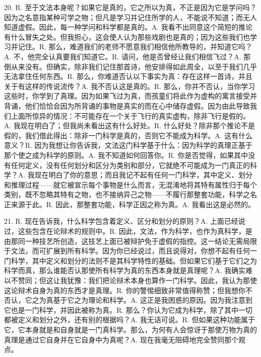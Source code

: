 20. R. 至于文法本身呢？如果它是真的，它之所以为真，不正是因为它是学问吗？因为之名意指某种可学之物；但凡是学习并记住所学的人，不能说不知道；而无人知道虚假。因此，每一种学问和科学都是真的。A. 我看不出同意这个简短的推论有什么冒失之处。但我担心，这会使人认为那些戏剧也是真的；因为这些我们也学习并记住。R. 那么，难道我们的老师不愿意我们相信他所教导的，并知道它吗？A. 不，他完全认真要我们知道它。R. 请问，他是否曾经让我们相信飞过？A. 那倒从来没有。但确实，除非我们记住那首诗，他安排得如此周全，以至于我们几乎无法拿住任何东西。R. 那么，你难道否认以下事实为真：存在这样一首诗，并且关于有这样的传说流传？A. 我不否认这是真的。R. 那么，你并不否认，当你学习这些时，你学到了真理。因为如果飞过为真，而孩童们将此作为虚构的寓言接受并背诵，他们恰恰会因为所背诵的事物是真实的而在心中储存虚假。因为由此导致我们上面所惊异的情况：不可能存在一个关于飞行的真实虚构，除非飞行是假的。A. 我现在明白了；但我尚未看出这有什么好处。R. 什么好处？除非那个推论不是假的，我们借此得出：除非一门科学是真的，否则它不能成为科学。A. 这有什么意义？R. 因为我想让你告诉我，文法这门科学基于什么：因为科学的真理正基于那个使之成为科学的原则。A. 我不知道如何回答你。R. 你是否觉得，如果其中没有任何定义，没有任何划分和区分为类别和部分，它就绝不可能成为一门真正的科学？A. 我现在明白了你的意思；而且我记不起有任何一门科学，其中定义、划分和推理过程——就它被宣示每个事物是什么而言，无混淆地将其特有属性归于每个类别，既不忽略其特有之物，也不接纳异己之物——不履行那整套功能，科学之名正来源于此。R. 因此，那整套功能，科学正因之称为真。A. 我看出这是必然的。\par

21. R. 现在告诉我，什么科学包含着定义、区分和划分的原则？A. 上面已经说过，这些包含在论辩术的规则中。R. 因此，文法，作为科学，也作为真科学，是由那同一种技艺所创造，这技艺上面已被辩护免于虚假的指控。这一结论无需局限于文法，而可扩展到所有科学。因为你已经说过，而且说得对，你想不起有任何一门科学，其中定义和划分的法则不是其科学特性的基础。但如果它们基于它们之为科学而真，那么谁能否认那使所有科学为真的东西本身就是真理呢？A. 我确实难以不赞同；但这让我犹豫：我们把论辩术本身也算作一门科学。因此，我认为那使这论辩术自身为真的东西才是真理。R. 你的警惕细致非常值得称赞；但我想你不否认，它之为真基于它之为理论和科学。A. 这正是我困惑的原因。因为我注意到它也是一门科学，并因此被称为真。R. 那么？你认为它成为科学，除了其中一切都被定义和划分之外，还有别的根据吗？A. 我无话可说。R. 但如果这种功能属于它，它本身就是和自身就是一门真科学。那么，为何有人会惊讶于那使万物为真的真理是通过它自身并在它自身中为真呢？A. 现在我毫无阻碍地完全赞同那个观点。\par

